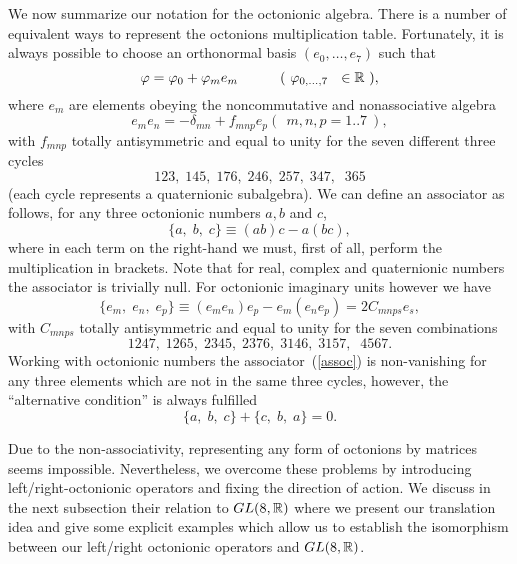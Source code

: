 \documentclass[a4paper,12pt]{book}
\begin{document}
We now summarize our notation for the octonionic algebra. There is a number
of equivalent ways to represent the octonions multiplication table.
Fortunately, it is always possible to choose an orthonormal basis $%
(e_{0},\ldots ,e_{7})$ such that 
\begin{equation}
\varphi =\varphi _{0}+\varphi _{m}e_{m}\quad \quad \quad (~\varphi
_{0,...,7}~~\in \Bbb{R}~),
\end{equation}
where $e_{m}$ are elements obeying the noncommutative and nonassociative
algebra 
\begin{equation}
e_{m}e_{n}=-\delta _{mn}+f_{mnp}e_{p}(~{\ m,n,p=1..7}~),
\end{equation}
with $f_{mnp}$ totally antisymmetric and equal to unity for the seven
different three cycles 
\[
123,\;145,\;176,\;246,\;257,\;347,\;\;365 
\]
(each cycle represents a quaternionic subalgebra). We can define an
associator as follows, for any three octonionic numbers $a,b$ and $c$, 
\begin{equation}
\{a,\;b,\;c\}\equiv (ab)c-a(bc),
\end{equation}
where in each term on the right-hand we must, first of all, perform the
multiplication in brackets. Note that for real, complex and quaternionic
numbers the associator is trivially null. For octonionic imaginary units
however we have 
\begin{equation}
\{e_{m},\;e_{n},\;e_{p}\}\equiv
(e_{m}e_{n})e_{p}-e_{m}(e_{n}e_{p})=2C_{mnps}e_{s},  \label{assoc}
\end{equation}
with $C_{mnps}$ totally antisymmetric and equal to unity for the seven
combinations 
\[
1247,\;1265,\;2345,\;2376,\;3146,\;3157,\;\;4567. 
\]
Working with octonionic numbers the associator~(\ref{assoc}) is
non-vanishing for any three elements which are not in the same three cycles,
however, the ``alternative condition'' is always fulfilled 
\begin{equation}
\{a,\;b,\;c\}+\{c,\;b,\;a\}=0.  \label{rul}
\end{equation}

Due to the non-associativity, representing any form of octonions by matrices
seems impossible. Nevertheless, we overcome these problems by introducing
left/right-octonionic operators and fixing the direction of action. We
discuss in the next subsection their relation to $GL(8,\Bbb{R})$ where we
present our translation idea and give some explicit examples which allow us
to establish the isomorphism between our left/right octonionic operators and 
$GL(8,\Bbb{R})$.
\end{document}
